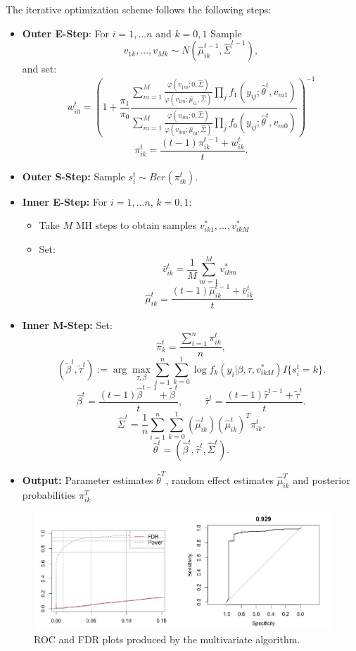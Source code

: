 \documentclass{article}\usepackage[]{graphicx}\usepackage[]{color}
\makeatletter
\def\maxwidth{ %
  \ifdim\Gin@nat@width>\linewidth
    \linewidth
  \else
    \Gin@nat@width
  \fi
}
\makeatother
\begin{document}
The iterative optimization scheme follows the following steps: 
\begin{itemize}
\item \textbf{Outer E-Step}: For $i=1,...n$ and $k=0,1$ Sample
$$
v_{1k},...,v_{Mk} \sim N(\hat\mu_{ik}^{t-1}, \hat\Sigma^{t-1}),
$$
and set:
$$
w_{i0}^{t} = 
 \left(1 + \frac{\pi_1}{\pi_0}
\frac{\sum_{m=1}^{M} \frac{\varphi(v_{1m};0,\hat\Sigma)}{\varphi(v_{1m}; \hat\mu_{i1}, \hat\Sigma)}\prod_{j} f_1(y_{ij} ; \hat\theta^t, v_{m1})}
{\sum_{m=1}^{M}\frac{\varphi(v_{0m};0,\hat\Sigma)}{\varphi(v_{0m}; \hat\mu_{i0}, \hat\Sigma)} \prod_{j} f_0(y_{ij} ; \hat\theta^{t}, v_{m0})} 
\right)^{-1} 
$$$$
\pi_{ik}^t = \frac{(t - 1)\pi_{ik}^{t-1} + w_{ik}^{t}}{t}.
$$

\item \textbf{Outer S-Step:} Sample $s_{i}^t \sim Ber(\pi_{ik}^t)$.

\item \textbf{Inner E-Step:} For $i=1,...n$, $k=0,1$:
	\begin{itemize}
	\item Take $M$ MH steps to obtain samples $v_{ik1}^*,...,v_{ikM}^*$
	\item Set:
	$$
	\bar{v}_{ik}^{t} = \frac{1}{M} \sum_{m=1}^{M} v^*_{ikm}
	$$$$
	\hat\mu^{t}_{ik} = \frac{(t - 1) \hat\mu^{t-1}_{ik} + \bar{v}_{ik}^{t}}{t}
	$$
	\end{itemize}

\item \textbf{Inner M-Step:} Set:
$$
\hat\pi^t_k = \frac{\sum_{i=1}^{n} \pi_{ik}^t}{n},
$$$$
(\tilde\beta^t, \tilde\tau^t) := \arg\max_{\tau, \beta} \sum_{i=1}^{n} \sum_{k=0}^{1} \log f_k(y_i | \beta, \tau, v^{*}_{ikM}) I\{s_{i}^{t} = k\}.
$$$$
\hat\beta^{t} = \frac{(t - 1) \hat\beta^{t-1} + \tilde\beta^{t}}{t}, \;\;\;\;\;\;\;\; 
\hat\tau^{t} = \frac{(t - 1) \hat\tau^{t-1} + \tilde\tau^{t}}{t}.
$$$$
\hat\Sigma^{t} = \frac{1}{n}\sum_{i=1}^{n}\sum_{k=0}^{1} (\hat\mu_{ik}^t)(\hat\mu_{ik}^t)^{T} \pi_{ik}^{t}.
$$$$
\hat\theta^t = (\hat\beta^{t}, \hat\tau^{t}, \hat\Sigma^{t}).
$$

\item \textbf{Output:} Parameter estimates $\hat\theta^T$, random effect estimates $\hat\mu_{ik}^T$ and posterior probabilities $\pi^T_{ik}$
\end{itemize}

\begin{figure}
\includegraphics[width=\maxwidth]{figures/multivaraiteROC} \caption[]{ROC and FDR plots produced by the multivariate algorithm.}
\label{IL4}
\end{figure}
\end{document}

